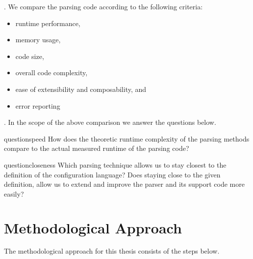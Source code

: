 . We compare the parsing code according to the following criteria:

\begin{itemize}
  \item runtime performance,
  \item memory usage,
  \item code size,
  \item overall code complexity,
  \item ease of extensibility and composability, and
  \item error reporting
\end{itemize}

. In the scope of the above comparison we answer the questions below.

\begin{restatable}{question}{speed}
  \label{que:speed}
  How does the theoretic runtime complexity of the parsing methods compare to the actual measured runtime of the parsing code?
\end{restatable}

\begin{restatable}{question}{closeness}
  \label{que:closeness}
  Which parsing technique allows us to stay closest to the definition of the configuration language? Does staying close to the given definition,
  allow us to extend and improve the parser and its support code more easily?
\end{restatable}

\section{Methodological Approach}

The methodological approach for this thesis consists of the steps below.

